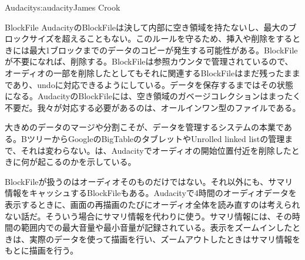 \begin{aosachapter}{Audacity}{s:audacity}{James Crook}
\begin{aosasect1}{BlockFile}
AudacityのBlockFileは決して内部に空き領域を持たないし、最大のブロックサイズを超えることもない。このルールを守るため、挿入や削除をするときには最大1ブロックまでのデータのコピーが発生する可能性がある。BlockFileが不要になれば、削除する。BlockFileは参照カウンタで管理されているので、オーディオの一部を削除したとしてもそれに関連するBlockFileはまだ残ったままであり、undoに対応できるようにしている。データを保存するまではその状態になる。AudacityのBlockFileには、空き領域のガベージコレクションはまったく不要だ。我々が対応する必要があるのは、オールインワン型のファイルである。

大きめのデータのマージや分割こそが、データを管理するシステムの本業である。BツリーからGoogleのBigTableのタブレットやUnrolled linked listの管理まで、それは変わらない。は、Audacityでオーディオの開始位置付近を削除したときに何が起こるのかを示している。


BlockFileが扱うのはオーディオそのものだけではない。それ以外にも、サマリ情報をキャッシュするBlockFileもある。Audacityで4時間のオーディオデータを表示するときに、画面の再描画のたびにオーディオ全体を読み直すのは考えられない話だ。そういう場合にサマリ情報を代わりに使う。サマリ情報には、その時間の範囲内での最大音量や最小音量が記録されている。表示をズームインしたときは、実際のデータを使って描画を行い、ズームアウトしたときはサマリ情報をもとに描画を行う。


\end{aosasect1}
\end{aosachapter}
